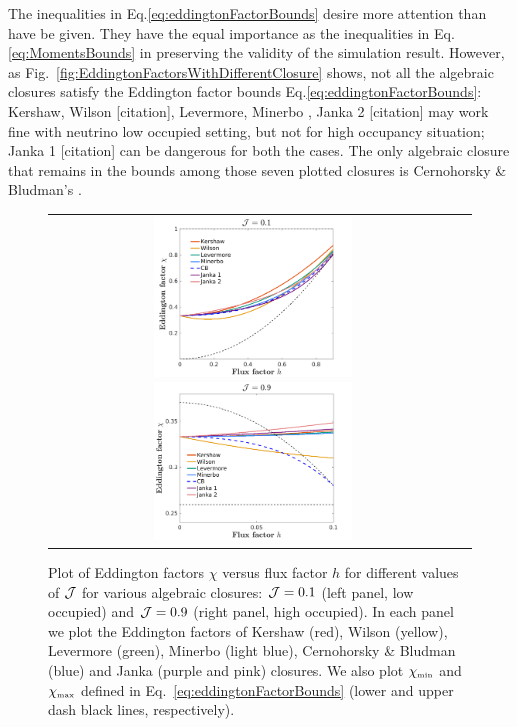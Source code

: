 The inequalities in Eq.\ref{eq:eddingtonFactorBounds} desire more attention than have be given.
They have the equal importance as the inequalities in Eq.\ref{eq:MomentsBounds} in preserving the validity of the simulation result.
However, as Fig.~\eqref{fig:EddingtonFactorsWithDifferentClosure} shows, not all the algebraic closures satisfy the Eddington factor bounds Eq.\ref{eq:eddingtonFactorBounds}: Kershaw\cite{kershaw_1976}, Wilson [citation], Levermore\cite{levermore_1984}, Minerbo \cite{minerbo_1978}, Janka 2 [citation] may work fine with neutrino low occupied setting, but not for high occupancy situation; Janka 1 [citation] can be dangerous for both the cases. The only algebraic closure that remains in the bounds among those seven plotted closures is Cernohorsky \& Bludman's \cite{cernohorskyBludman_1994}.
\begin{figure}[h]
  \centering
  \begin{tabular}{cc}
    \includegraphics[width=0.5\textwidth]{figures/Closures0_10}
    \includegraphics[width=0.5\textwidth]{figures/Closures0_90}
  \end{tabular}
   \caption{Plot of Eddington factors $\chi$ versus flux factor $h$ for different values of $\mathcal{J}$ for various algebraic closures: $\mathcal{J}=0.1$ (left panel, low occupied) and $\mathcal{J}=0.9$ (right panel, high occupied).  In each panel we plot the Eddington factors of Kershaw (red), Wilson (yellow), Levermore (green), Minerbo (light blue), Cernohorsky \& Bludman (blue) and Janka (purple and pink) closures.  We also plot $\chi_{\mbox{\tiny min}}$ and $\chi_{\mbox{\tiny max}}$ defined in Eq.~\eqref{eq:eddingtonFactorBounds} (lower and upper dash black lines, respectively).}
  \label{fig:EddingtonFactorsWithDifferentClosure}
\end{figure}

